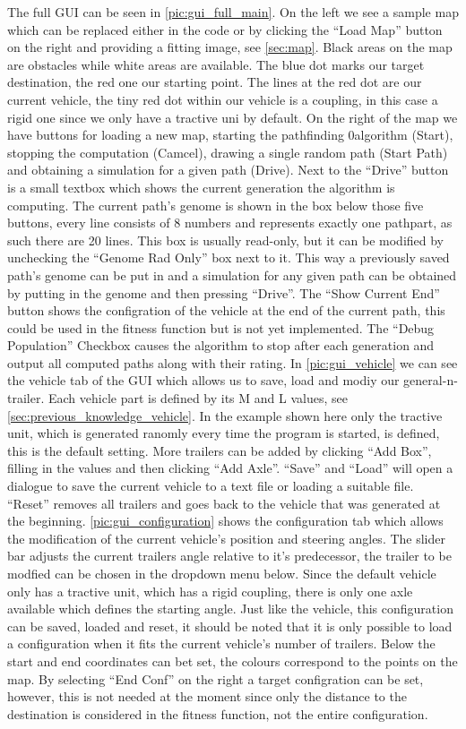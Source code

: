 The full GUI can be seen in \ref{pic:gui_full_main}. On the left we see a sample map which can be replaced either in the code or by clicking the "`Load Map"' button on the right and providing a fitting image, see \ref{sec:map}. Black areas on the map are obstacles while white areas are available. The blue dot marks our target destination, the red one our starting point. The lines at the red dot are our current vehicle, the tiny red dot within our vehicle is a coupling, in this case a rigid one since we only have a tractive uni by default. On the right of the map we have buttons for loading a new map, starting the pathfinding 0algorithm (Start), stopping the computation (Camcel), drawing a single random path (Start Path) and obtaining a simulation for a given path (Drive). Next to the "`Drive"' button is a small textbox which shows the current generation the algorithm is computing. The current path's genome is shown in the box below those five buttons, every line consists of 8 numbers and represents exactly one pathpart, as such there are 20 lines. This box is usually read-only, but it can be modified by unchecking the "`Genome Rad Only"' box next to it. This way a previously saved path's genome can be put in and a simulation for any given path can be obtained by putting in the genome and then pressing "`Drive"'. The "`Show Current End"' button shows the configration of the vehicle at the end of the current path, this could be used in the fitness function but is not yet implemented. The "`Debug Population"' Checkbox causes the algorithm to stop after each generation and output all computed paths along with their rating. 
In \ref{pic:gui_vehicle} we can see the vehicle tab of the GUI which allows us to save, load and modiy our general-n-trailer. Each vehicle part is defined by its M and L values, see \ref{sec:previous_knowledge_vehicle}. In the example shown here only the tractive unit, which is generated ranomly every time the program is started, is defined, this is the default setting. More trailers can be added by clicking "`Add Box"', filling in the values and then clicking "`Add Axle"'. "`Save"' and "`Load"' will open a dialogue to save the current vehicle to a text file or loading a suitable file. "`Reset"' removes all trailers and goes back to the vehicle that was generated at the beginning.
\ref{pic:gui_configuration} shows the configuration tab which allows the modification of the current vehicle's position and steering angles. The slider bar adjusts the current trailers angle relative to it's predecessor, the trailer to be modfied can be chosen in the dropdown menu below. Since the default vehicle only has a tractive unit, which has a rigid coupling, there is only one axle available which defines the starting angle. Just like the vehicle, this configuration can be saved, loaded and reset, it should be noted that it is only possible to load a configuration when it fits the current vehicle's number of trailers. Below the start and end coordinates can bet set, the colours correspond to the points on the map. By selecting "`End Conf"' on the right a target configration can be set, however, this is not needed at the moment since only the distance to the destination is considered in the fitness function, not the entire configuration.

